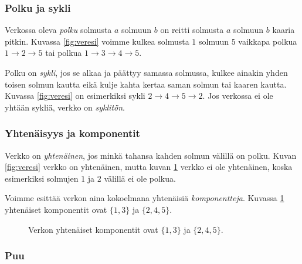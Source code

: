 \subsubsection{Polku ja sykli}

Verkossa oleva \emph{polku} solmusta $a$ solmuun $b$
on reitti solmusta $a$ solmuun $b$ kaaria pitkin.
Kuvassa \ref{fig:veresi}
voimme kulkea solmusta $1$ solmuun $5$
vaikkapa polkua $1 \rightarrow 2 \rightarrow 5$
tai polkua
$1 \rightarrow 3 \rightarrow 4 \rightarrow 5$.

Polku on \emph{sykli},
jos se alkaa ja päättyy samassa solmussa,
kulkee ainakin yhden toisen solmun kautta
eikä kulje kahta kertaa saman solmun tai kaaren kautta.
Kuvassa \ref{fig:veresi} on esimerkiksi sykli
$2 \rightarrow 4 \rightarrow 5 \rightarrow 2$.
Jos verkossa ei ole yhtään sykliä, verkko on \emph{syklitön}.

\subsubsection{Yhtenäisyys ja komponentit}

Verkko on \emph{yhtenäinen},
jos minkä tahansa kahden solmun välillä on polku.
Kuvan \ref{fig:veresi} verkko on yhtenäinen,
mutta kuvan \ref{fig:veryht} verkko ei ole yhtenäinen,
koska esimerkiksi solmujen $1$ ja $2$ välillä ei ole polkua.

Voimme esittää verkon aina kokoelmana yhtenäisiä \emph{komponentteja}.
Kuvassa \ref{fig:veryht} yhtenäiset komponentit
ovat $\{1,3\}$ ja $\{2,4,5\}$.

\begin{figure}
\center
\begin{center}
\end{center}
\caption{Verkon yhtenäiset komponentit ovat $\{1,3\}$ ja $\{2,4,5\}$.}
\label{fig:veryht}
\end{figure}

\subsubsection{Puu}

